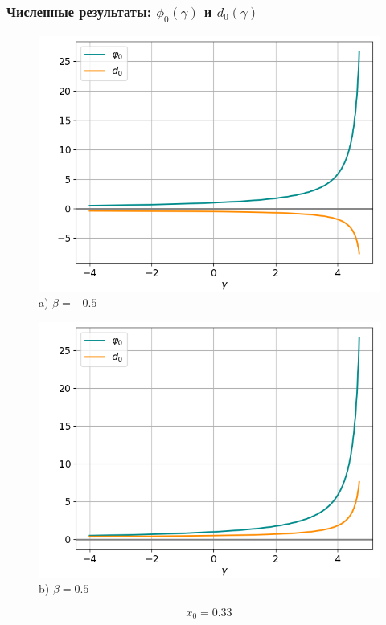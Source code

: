 \documentclass[fullscreen=true, unicode, bookmarks=false]{beamer}
\begin{document}
\begin{frame}
\frametitle{ Численные результаты: $ \phi_0(\gamma) $ и $ d_0(\gamma) $ }

\begin{figure} 
\begin{minipage}[h]{0.49\linewidth}
\begin{center}
\includegraphics[scale=0.38]{divergent_phi0d0_x0=0,33,beta=-0,5.png} \\ {\scriptsize a) $ \beta = -0.5 $}
\end{center}
\end{minipage} 
\hfill
\begin{minipage}[h]{0.49\linewidth}
\begin{center}
\includegraphics[scale=0.38]{divergent_phi0d0_x0=0,33,beta=0,5.png}  \\ {\scriptsize b) $ \beta = 0.5 $}
\end{center}
\end{minipage} 
\end{figure}

$$ x_0 = 0.33 $$

\end{frame}
\end{document}

